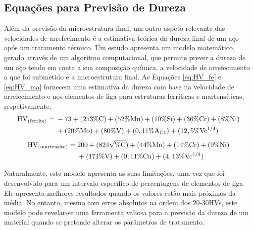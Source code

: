 \subsection{Equações para Previsão de Dureza}\label{ssec:previsao_dureza}
Além da previsão da microestrutura final, um outro aspeto relevante das velocidades de arrefecimento é a estimativa teórica da dureza final de um aço após um tratamento térmico. Um estudo apresenta um modelo matemático, gerado através de um algoritmo computacional, que permite prever a dureza de um aço tendo em conta a sua composição química, a velocidade de arrefecimento a que foi submetido e a microestrutura final\cite{Trzaska2016}. As Equações \ref{eq:HV_fe} e \ref{eq:HV_ma} fornecem uma estimativa da dureza com base na velocidade de arrefecimento e nos elementos de liga para estruturas ferríticas e martensíticas, respetivamente.
\begin{equation}
    \begin{aligned}
    \mathrm{HV\textsubscript{(ferrite)}} = {}   & -73 + (253\%\mathrm{C}) + (52\%\mathrm{Mn}) + (10\%\mathrm{Si}) + (36\%\mathrm{Cr}) + (8\%\mathrm{Ni})\\
                                                & + (20\%\mathrm{Mo}) + (80\%\mathrm{V}) + (0,11\%\mathrm{A\textsubscript{C1}}) + (12,5\%\mathrm{Vc\textsuperscript{1/4}})
    \end{aligned}
    \label{eq:HV_fe}
\end{equation}
\begin{equation}
    \begin{aligned}
    \mathrm{HV\textsubscript{(martensite)}} = {}    & 200 + (824\sqrt{\%\mathrm{C}}) + (44\%\mathrm{Mn}) + (14\%\mathrm{Cr}) + (9\%\mathrm{Ni})\\
                                                    &+ (171\%\mathrm{V}) + (0,11\%\mathrm{Cu}) + (4,13\%\mathrm{Vc\textsuperscript{1/4}})
    \end{aligned}
    \label{eq:HV_ma}
\end{equation}
\par
Naturalmente, este modelo apresenta as suas limitações, uma vez que foi desenvolvido para um intervalo específico de percentagens de elementos de liga. Ele apresenta melhores resultados quando os valores estão mais próximos da média. No entanto, mesmo com erros absolutos na ordem dos 20-30HVs, este modelo pode revelar-se uma ferramenta valiosa para a previsão da dureza de um material quando se pretende alterar os parâmetros de tratamento.


